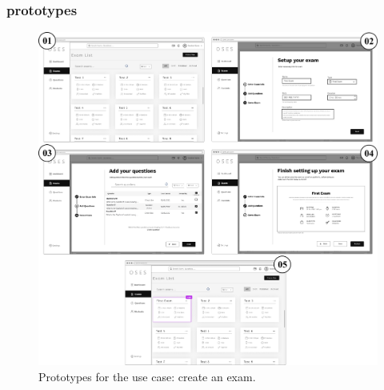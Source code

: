 \documentclass[]{uc2pfecaneva}
\begin{document}
\subsubsection{prototypes}
\begin{figure}[h]
	
	\centering
	\includegraphics[width=\textwidth]{images/prototypes_create_exam}
	
	\caption{Prototypes for the use case: create an exam.}
\end{figure}
\clearpage
\end{document}
